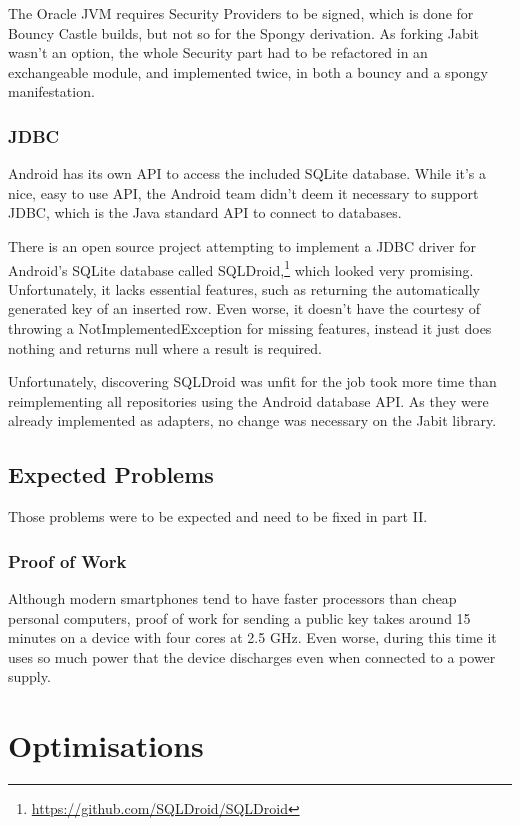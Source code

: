 \documentclass{bfh}
\begin{document}
  The Oracle JVM requires Security Providers to be signed, which is done for Bouncy Castle builds, but not so for the Spongy derivation. As forking Jabit wasn’t an option, the whole Security part had to be refactored in an exchangeable module, and implemented twice, in both a bouncy and a spongy manifestation.

  \subsubsection{JDBC}
  Android has its own API to access the included SQLite database. While it’s a nice, easy to use API, the Android team didn’t deem it necessary to support JDBC, which is the Java standard API to connect to databases.

  There is an open source project attempting to implement a JDBC driver for Android’s SQLite database called SQLDroid,\footnote{\url{https://github.com/SQLDroid/SQLDroid}} which looked very promising. Unfortunately, it lacks essential features, such as returning the automatically generated key of an inserted row. Even worse, it doesn't have the courtesy of throwing a NotImplementedException for missing features, instead it just does nothing and returns null where a result is required.

  Unfortunately, discovering SQLDroid was unfit for the job took more time than reimplementing all repositories using the Android database API. As they were already implemented as adapters, no change was necessary on the Jabit library.

  \subsection{Expected Problems}
  Those problems were to be expected and need to be fixed in part II.

  \subsubsection{Proof of Work}
  Although modern smartphones tend to have faster processors than cheap personal computers, proof of work for sending a public key takes around 15 minutes on a device with four cores at 2.5 GHz. Even worse, during this time it uses so much power that the device discharges even when connected to a power supply.

  \section{Optimisations}
\end{document}
